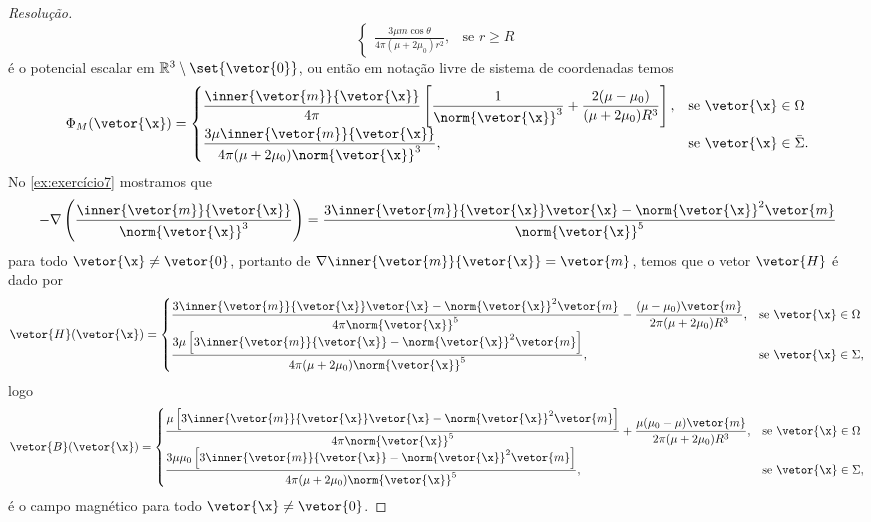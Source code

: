 \begin{proof}[Resolução]
\begin{equation*}
\begin{cases}
            \displaystyle\frac{3\mu m \cos\theta}{4\pi (\mu + 2\mu_0)r^2},&\text{se }r \geq R
        \end{cases}
    \end{equation*}
    é o potencial escalar em \(\mathbb{R}^3 \setminus \set{\vetor{0}}\), ou então em notação livre de sistema de coordenadas temos
    \begin{equation*}
        \Phi_M(\vetor{\x}) =
        \begin{cases}
            \displaystyle\frac{\inner{\vetor{m}}{\vetor{\x}}}{4\pi}\left[\frac{1}{\norm{\vetor{\x}}^3} + \frac{2(\mu - \mu_0)}{(\mu + 2\mu_0)R^3}\right],&\text{se }\vetor{\x} \in \Omega\\
            \displaystyle\frac{3\mu \inner{\vetor{m}}{\vetor{\x}}}{4\pi (\mu + 2\mu_0) \norm{\vetor{\x}}^3},&\text{se }\vetor{\x}\in \bar{\Sigma}.
        \end{cases}
    \end{equation*}
    No \cref{ex:exercício7} mostramos que
    \begin{equation*}
        -\nabla \left(\frac{\inner{\vetor{m}}{\vetor{\x}}}{\norm{\vetor{\x}}^3}\right) = \frac{3\inner{\vetor{m}}{\vetor{\x}}\vetor{\x} - \norm{\vetor{\x}}^2\vetor{m}}{\norm{\vetor{\x}}^5}
    \end{equation*}
    para todo \(\vetor{\x} \neq \vetor{0}\), portanto de \(\nabla {\inner{\vetor{m}}{\vetor{\x}}} = \vetor{m}\), temos que o vetor \(\vetor{H}\) é dado por
    \begin{equation*}
        \vetor{H}(\vetor{\x}) = \begin{cases}
            \displaystyle\frac{3\inner{\vetor{m}}{\vetor{\x}}\vetor{\x} - \norm{\vetor{\x}}^2\vetor{m}}{4\pi \norm{\vetor{\x}}^5} - \frac{(\mu - \mu_0)\vetor{m}}{2\pi(\mu + 2\mu_0)R^3},&\text{se }\vetor{\x} \in \Omega\\
            \displaystyle\frac{3\mu \left[3\inner{\vetor{m}}{\vetor{\x}} - \norm{\vetor{\x}}^2\vetor{m}\right]}{4\pi (\mu + 2\mu_0)\norm{\vetor{\x}}^5},&\text{se }\vetor{\x} \in \Sigma,
        \end{cases}
    \end{equation*}
    logo
    \begin{equation*}
        \vetor{B}(\vetor{\x}) = \begin{cases}
            \displaystyle\frac{\mu\left[3\inner{\vetor{m}}{\vetor{\x}}\vetor{\x} - \norm{\vetor{\x}}^2\vetor{m}\right]}{4\pi \norm{\vetor{\x}}^5} + \frac{\mu(\mu_0 - \mu)\vetor{m}}{2\pi(\mu + 2\mu_0)R^3},&\text{se }\vetor{\x} \in \Omega\\
            \displaystyle\frac{3\mu\mu_0 \left[3\inner{\vetor{m}}{\vetor{\x}} - \norm{\vetor{\x}}^2\vetor{m}\right]}{4\pi (\mu + 2\mu_0)\norm{\vetor{\x}}^5},&\text{se }\vetor{\x} \in \Sigma,
        \end{cases}
    \end{equation*}
    é o campo magnético para todo \(\vetor{\x} \neq \vetor{0}\).
\end{proof}
